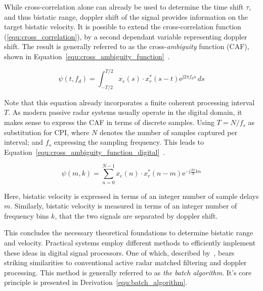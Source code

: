 While cross-correlation alone can already be used to determine the time shift \(\tau\), and thus bistatic range, doppler shift of the signal provides information on the target bistatic velocity. It is possible to extend the cross-correlation function (\ref{equ:cross_correlation}), by a second dependant variable representing doppler shift. The result is generally referred to as the cross-\emph{ambiguity} function (CAF), shown in Equation~\ref{equ:cross_ambiguity_function}~\cite[p.~132]{Malanowski2019}.

\begin{equation}\label{equ:cross_ambiguity_function}
    \psi(t, f_{d}) = \int_{-T/2}^{T/2} {x_{e}(s) \cdot x_{r}^{*}} \left( s - t \right)\mathrm{e}^{\mathrm{j} 2 \pi f_{d} s} \, d s
\end{equation}

Note that this equation already incorporates a finite coherent processing interval \(T\). As modern passive radar systems usually operate in the digital domain, it makes sense to express the CAF in terms of discrete samples. Using \(T = N / f_{s}\) as substitution for CPI, where \(N\) denotes the number of samples captured per interval; and \(f_{s}\) expressing the sampling frequency. This leads to Equation~\ref{equ:cross_ambiguity_function_digital}~\cite[p.~134]{Malanowski2019}.

\begin{equation}\label{equ:cross_ambiguity_function_digital}
    \psi(m,k) = \sum_{n = 0}^{N - 1}{x_{e}(n) \cdot x_{r}^{*}(n - m) \mathrm{e}^{-\mathrm{j} \frac{2 \pi}{N} k n}}
\end{equation}

Here, bistatic velocity is expressed in terms of an integer number of sample delays \(m\). Similarly, bistatic velocity is measured in terms of an integer number of frequency bins \(k\), that the two signals are separated by doppler shift.

This concludes the necessary theoretical foundations to determine bistatic range and velocity. Practical systems employ different methods to efficiently implement these ideas in digital signal processors. One of which, described by~\cite[p.~138]{Malanowski2019}, bears striking similarities to conventional active radar matched filtering and doppler processing. This method is generally referred to as \emph{the batch algorithm}. It's core principle is presented in Derivation~\ref{equ:batch_algorithm}.

